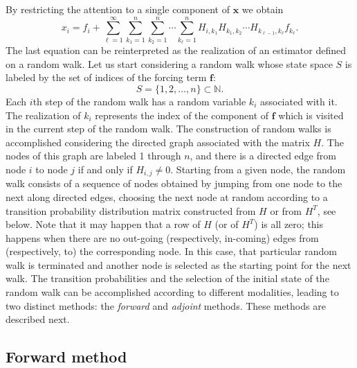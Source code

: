 \documentclass[times]{nlaauth}
\begin{document}
By restricting the attention to a single component of $\mathbf{x}$ we
obtain
\begin{equation}
x_i=f_i + \sum_{\ell=1}^\infty \sum_{k_1=1}^n\sum_{k_2=1}^n\cdots
\sum_{k_{\ell}=1}^n
H_{i,k_1}H_{k_1,k_2}\cdots H_{k_{\ell-1}, k_{\ell}}f_{k_{\ell}}.
\label{forward}
\end{equation}
The last equation can be reinterpreted as the realization of an estimator
defined on a random walk.  Let us start considering a random walk whose
state space $S$ is labeled by the set of indices of the forcing term
$\mathbf{f}$:
\[
S=\{1,2,\ldots, n\} \subset \mathbb{N}.
\]
Each $i$th step of the random walk has a random variable
$k_i$ associated with it. The realization of $k_i$ represents the index of the
component of $\mathbf{f}$
which is visited in the current step of the random walk.
 The construction of random walks is accomplished considering the directed graph associated with the matrix $H$.
The nodes of this graph are labeled 1 through $n$, and there is a directed edge from node $i$ to node $j$
if and only if $H_{i,j}\ne 0$. Starting from a given node, the random walk consists of a sequence of nodes obtained by
jumping from one node to the next along directed edges, choosing the next node at random according to a transition
probability distribution matrix constructed from $H$ or from $H^T$, see below. Note that it may happen that a row of $H$
(or of $H^T$) is all zero; this happens
when there are no out-going (respectively, in-coming) edges from (respectively, to)
the corresponding node. In this case, that particular random walk is terminated and another
node is selected as the starting point for the next walk.
The transition probabilities and the selection of
the initial state of the random walk can be accomplished according to
different modalities, leading to two distinct methods:
the \textit{forward} and \textit{adjoint} methods.
These methods are described next.

\subsection{Forward method}
\label{subsec:forward}
\end{document}
